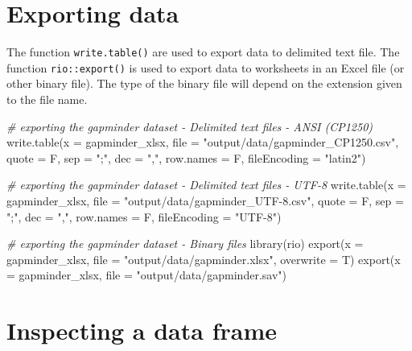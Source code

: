\documentclass[
]{book}
\newenvironment{Shaded}{\begin{snugshade}}{\end{snugshade}}
\newcommand{\AttributeTok}[1]{\textcolor[rgb]{0.77,0.63,0.00}{#1}}
\newcommand{\CommentTok}[1]{\textcolor[rgb]{0.56,0.35,0.01}{\textit{#1}}}
\newcommand{\FunctionTok}[1]{\textcolor[rgb]{0.00,0.00,0.00}{#1}}
\newcommand{\NormalTok}[1]{#1}
\newcommand{\StringTok}[1]{\textcolor[rgb]{0.31,0.60,0.02}{#1}}
\begin{document}
\hypertarget{exporting-data}{%
\section{Exporting data}\label{exporting-data}}

The function \texttt{write.table()} are used to export data to delimited text file. The function \texttt{rio::export()} is used to export data to worksheets in an Excel file (or other binary file). The type of the binary file will depend on the extension given to the file name.

\begin{Shaded}
\begin{Highlighting}[]
\CommentTok{\# exporting the gapminder dataset {-} Delimited text files {-} ANSI (CP1250)}
\FunctionTok{write.table}\NormalTok{(}\AttributeTok{x =}\NormalTok{ gapminder\_xlsx, }\AttributeTok{file =} \StringTok{"output/data/gapminder\_CP1250.csv"}\NormalTok{, }\AttributeTok{quote =}\NormalTok{ F, }\AttributeTok{sep =} \StringTok{";"}\NormalTok{, }\AttributeTok{dec =} \StringTok{","}\NormalTok{, }\AttributeTok{row.names =}\NormalTok{ F, }\AttributeTok{fileEncoding =} \StringTok{"latin2"}\NormalTok{)}

\CommentTok{\# exporting the gapminder dataset {-} Delimited text files {-} UTF{-}8}
\FunctionTok{write.table}\NormalTok{(}\AttributeTok{x =}\NormalTok{ gapminder\_xlsx, }\AttributeTok{file =} \StringTok{"output/data/gapminder\_UTF{-}8.csv"}\NormalTok{, }\AttributeTok{quote =}\NormalTok{ F, }\AttributeTok{sep =} \StringTok{";"}\NormalTok{, }\AttributeTok{dec =} \StringTok{","}\NormalTok{, }\AttributeTok{row.names =}\NormalTok{ F, }\AttributeTok{fileEncoding =} \StringTok{"UTF{-}8"}\NormalTok{)}

\CommentTok{\# exporting the gapminder dataset {-} Binary files}
\FunctionTok{library}\NormalTok{(rio)}
\FunctionTok{export}\NormalTok{(}\AttributeTok{x =}\NormalTok{ gapminder\_xlsx, }\AttributeTok{file =} \StringTok{"output/data/gapminder.xlsx"}\NormalTok{, }\AttributeTok{overwrite =}\NormalTok{ T)}
\FunctionTok{export}\NormalTok{(}\AttributeTok{x =}\NormalTok{ gapminder\_xlsx, }\AttributeTok{file =} \StringTok{"output/data/gapminder.sav"}\NormalTok{)}
\end{Highlighting}
\end{Shaded}

\hypertarget{inspecting-a-data-frame}{%
\section{Inspecting a data frame}\label{inspecting-a-data-frame}}
\end{document}
